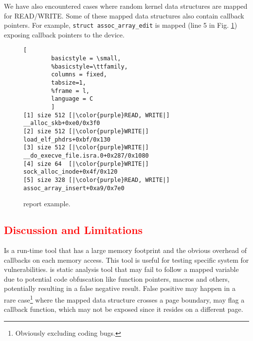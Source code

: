 We have also encountered cases where random kernel data structures are mapped for READ/WRITE. Some of these mapped data structures also contain callback pointers. For example, \texttt{struct assoc\_array\_edit} is mapped (line 5 in Fig. \ref{fig:dkasan-report}) exposing callback pointers to the device. 
%
\begin{figure}[t]
\begin{adjustbox}{width=0.9\linewidth}
        \begin{lstlisting}[
        basicstyle = \small,
        %basicstyle=\ttfamily,
        columns = fixed,
        tabsize=1,
        %frame = l,
        language = C
        ]
[1] size 512 [|\color{purple}READ, WRITE|] __alloc_skb+0xe0/0x3f0
[2] size 512 [|\color{purple}WRITE|] load_elf_phdrs+0xbf/0x130
[3] size 512 [|\color{purple}WRITE|] __do_execve_file.isra.0+0x287/0x1080
[4] size 64  [|\color{purple}WRITE|] sock_alloc_inode+0x4f/0x120
[5] size 328 [|\color{purple}READ, WRITE|] assoc_array_insert+0xa9/0x7e0
        \end{lstlisting}
\end{adjustbox}
        \caption{\dkasan report example.}
        \label{fig:dkasan-report}
\end{figure}

\subsection{\textcolor{red}{Discussion and Limitations}}
\dkasan Is a run-time tool that has a large memory footprint and the obvious overhead of callbacks on each memory access. This tool is useful for testing specific system for vulnerabilities.
\tool is static analysis tool that may fail to follow a mapped variable due to potential code obfuscation like function pointers, macros and others, potentially resulting in a false negative result. False positive may happen in a rare case\footnote{Obviously excluding coding bugs.} where the mapped  data  structure  crosses  a  page  boundary,  \tool may flag a callback function, which may not be exposed since it resides on a different page.